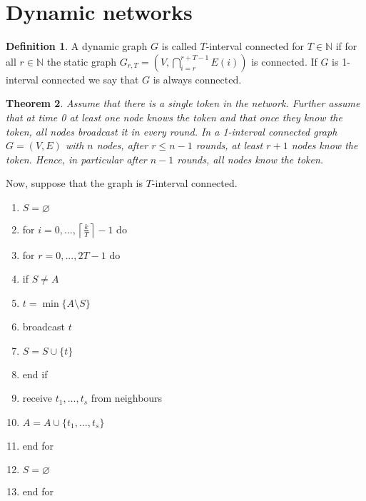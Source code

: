 \documentclass[a4paper, 12pt]{article}
\theoremstyle{plain}
\newtheorem{theorem}{Theorem}[section] %
\theoremstyle{definition}
\newtheorem{definition}[theorem]{Definition} %
\theoremstyle{lemma}
\theoremstyle{remark}
\theoremstyle{corollary}
\theoremstyle{example}
\begin{document}
	\section{Dynamic networks}
	\begin{definition}
		A dynamic graph $G$ is called $T$-interval connected for $T \in \mathbb{N}$ if for all $r\in \mathbb{N}$ the static graph $G_{r,T} = \left(V, \bigcap_{i=r}^{r+T-1} E(i)\right)$ is connected. If $G$ is 1-interval connected we say that $G$ is always connected.
	\end{definition}
	\begin{theorem}
		Assume that there is a single token in the network. Further assume that at time 0 at least one node knows the token and that once they know the token, all nodes broadcast it in every round. In a 1-interval connected graph $G=(V,E)$ with $n$ nodes, after $r\leq n-1$ rounds, at least $r+1$ nodes know the token. Hence, in particular after $n-1$ rounds, all nodes know the token.
	\end{theorem}
	Now, suppose that the graph is $T$-interval connected.
	\begin{enumerate}
		\item $S = \varnothing$
		\item for $i=0,...,\left\lceil\frac{k}{T}\right\rceil-1$ do
		\item for $r=0,...,2T-1$ do
		\item if $S \neq A$
		\item $t = \min\{A \setminus S\}$
		\item broadcast $t$
		\item $S = S \cup \{t\}$
		\item end if
		\item receive $t_1,...,t_s$ from neighbours
		\item $A = A \cup \{t_1,...,t_s\}$
		\item end for
		\item $S = \varnothing$
		\item end for
	\end{enumerate}
	
\end{document}

